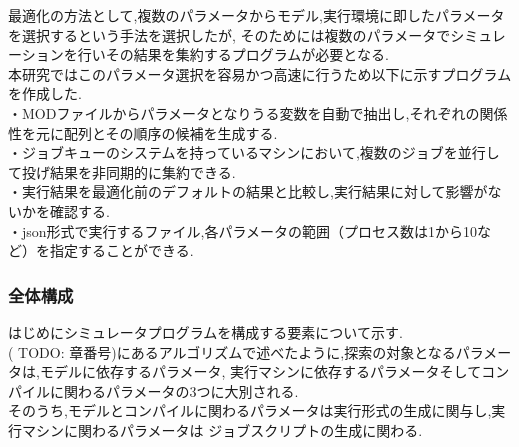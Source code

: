 最適化の方法として,複数のパラメータからモデル,実行環境に即したパラメータを選択するという手法を選択したが,
そのためには複数のパラメータでシミュレーションを行いその結果を集約するプログラムが必要となる.\\
本研究ではこのパラメータ選択を容易かつ高速に行うため以下に示すプログラムを作成した.\\
・MODファイルからパラメータとなりうる変数を自動で抽出し,それぞれの関係性を元に配列とその順序の候補を生成する.\\
・ジョブキューのシステムを持っているマシンにおいて,複数のジョブを並行して投げ結果を非同期的に集約できる.\\
・実行結果を最適化前のデフォルトの結果と比較し,実行結果に対して影響がないかを確認する.\\
・json形式で実行するファイル,各パラメータの範囲（プロセス数は1から10など）を指定することができる.\\
\subsubsection{全体構成}
はじめにシミュレータプログラムを構成する要素について示す.\\
( TODO: 章番号)にあるアルゴリズムで述べたように,探索の対象となるパラメータは,モデルに依存するパラメータ,
実行マシンに依存するパラメータそしてコンパイルに関わるパラメータの3つに大別される.\\
そのうち,モデルとコンパイルに関わるパラメータは実行形式の生成に関与し,実行マシンに関わるパラメータは
ジョブスクリプトの生成に関わる.\\
